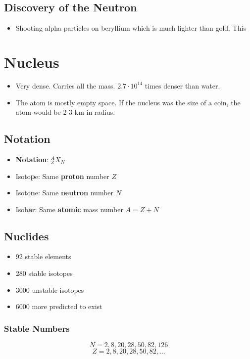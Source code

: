 \subsection{Discovery of the Neutron}
\begin{itemize}
    \item Shooting alpha particles on beryllium which is much lighter than gold. This 
\end{itemize}

\section{Nucleus}
\begin{itemize}
    \item Very dense. Carries all the mass. $2.7 ⋅ 10^{14}$ times denser than water.
    \item The atom is mostly empty space. If the nucleus was the size of a coin, the atom would be 2-3 km in radius. 
\end{itemize}
\subsection{Notation}
\begin{itemize}
    \item \textbf{Notation}: $_{Z}^{A}X_{N}$ 
    \item Isoto\textbf{p}e: Same \textbf{proton} number $Z$
    \item Isoto\textbf{n}e: Same \textbf{neutron} number $N$
    \item Isob\textbf{a}r: Same \textbf{atomic} mass number $A = Z + N$
\end{itemize}

\subsection{Nuclides}
\begin{itemize}
    \item 92 stable elements
    \item 280 stable isotopes
    \item 3000 unstable isotopes
    \item 6000 more predicted to exist
\end{itemize}
\subsubsection{Stable Numbers}
\begin{equation}
N = 2, 8, 20, 28, 50, 82, 126
\end{equation}
\begin{equation}
Z = 2, 8, 20, 28, 50, 82, \ldots     
\end{equation}
